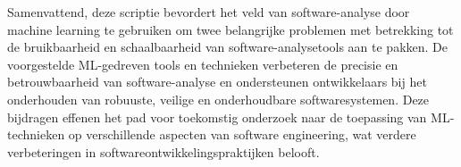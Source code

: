{Samenvattend, deze scriptie bevordert het veld van software-analyse door machine learning te gebruiken om twee belangrijke problemen met betrekking tot de bruikbaarheid en schaalbaarheid van software-analysetools aan te pakken. De voorgestelde ML-gedreven tools en technieken verbeteren de precisie en betrouwbaarheid van software-analyse en ondersteunen ontwikkelaars bij het onderhouden van robuuste, veilige en onderhoudbare softwaresystemen. Deze bijdragen effenen het pad voor toekomstig onderzoek naar de toepassing van ML-technieken op verschillende aspecten van software engineering, wat verdere verbeteringen in softwareontwikkelingspraktijken belooft.
}



